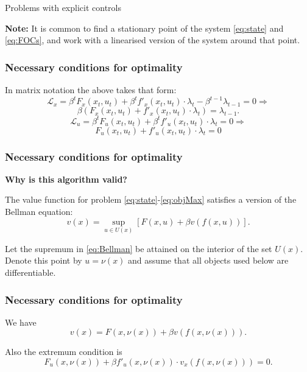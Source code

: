 \documentclass[10pt]{beamer}
\theoremstyle{definition}
\begin{document}
\begin{section}{Problems with explicit controls}
\begin{frame}[fragile]
\textbf{Note:} It is common to find a stationary point of the system \eqref{eq:state} and \eqref{eq:FOCs}, and work with a linearised version of the system around that point.
\end{frame}


\begin{frame}[fragile]
\frametitle{Necessary conditions for optimality}
In matrix notation the above takes that form:
\[ \mathcal{L}_x = \beta^t F_x(x_t,u_t)+\beta^t f'_x(x_t,u_t)\cdot \lambda_t - \beta^{t-1}\lambda_{t-1} = 0 \Rightarrow \]
\begin{equation}
\beta ( F_x(x_t,u_t)+ f'_x(x_t,u_t)\cdot \lambda_t ) = \lambda_{t-1}.
\label{eq:LagrX}
\end{equation}  \bigskip
\[ \mathcal{L}_u = \beta^t F_u (x_t,u_t)+ \beta^t f'_u(x_t,u_t)\cdot \lambda_t = 0 \Rightarrow \]
\begin{equation}
F_u (x_t,u_t)+ f'_u(x_t,u_t)\cdot \lambda_t = 0
\label{eq:LagrU}
\end{equation}
\end{frame}



\begin{frame}[fragile]
\frametitle{Necessary conditions for optimality}
\textbf{Why is this algorithm valid?}\bigskip \bigskip

The value function for problem \eqref{eq:state}-\eqref{eq:objMax} satisfies a version of the Bellman equation:
\begin{equation}
v(x) = \sup_{u \in U(x)}  \left[
F(x,u)+\beta v(f(x,u)) \right]. \label{eq:Bellman}
\end{equation}


Let the supremum in \eqref{eq:Bellman} be attained on the interior of the set $ U(x) $. Denote this point by $ u = \nu(x) $ and assume that all objects used below are differentiable.
\end{frame}



\begin{frame}[fragile]
\frametitle{Necessary conditions for optimality}
We have \begin{equation}
 v(x) = F(x,\nu(x)) + \beta v(f(x,\nu(x))) .
\label{eq:Bellman1}
\end{equation}

Also the extremum condition is \begin{equation}
F_u(x,\nu(x)) + \beta f'_u(x,\nu(x)) \cdot v_x(f(x,\nu(x))) = 0.
\label{eq:diffCntrl}
\end{equation} 


\end{frame}
\end{section}
\end{document}
